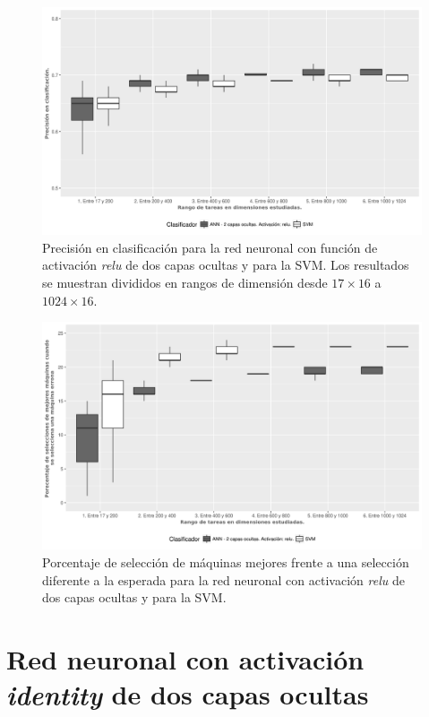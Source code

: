 \begin{figure}[H]
  \centering
  \includegraphics[width=\columnwidth]{imagenes/relu/3_accuracy_ann_2_capas_ocultas_relu.png}
  \caption{Precisión en clasificación para la red neuronal con función de activación \textit{relu} de dos capas ocultas y para la SVM. Los resultados se muestran divididos en rangos de dimensión desde $ 17 \times 16$ a $ 1024 \times 16$.}
  \label{fig:relu_accuracy}
\end{figure}

\begin{figure}[H]
  \centering
  \includegraphics[width=\columnwidth]{imagenes/relu/4_porcentaje_maquinas_mejores_ann_2_capas_ocultas_relu.png}
  \caption{Porcentaje de selección de máquinas mejores frente a una selección diferente a la esperada para la red neuronal con activación \textit{relu} de dos capas ocultas y para la SVM.}
  \label{fig:relu_maquinas_mejores}
\end{figure}
 
\section{Red neuronal con activación \textit{identity} de dos capas ocultas}

